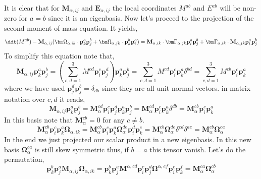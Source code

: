 It is clear that for $\mathbf{M}_{\alpha,ij}$ and $\textbf{E}_{\alpha,ij}$ the local coordinates $M^{ab}$ and $E^{ab}$ will be non-zero for $a=b$ since it is an eigenbasis. 
Now let's proceed to the projection of the second moment of mass equation. 
It yields, 
\begin{align*}
    \ddt (M^{ab})
    - \textbf{M}_{\alpha,ij}(
    \bm\Omega_{\alpha,ik}\cdot\textbf{p}_k^a\textbf{p}_j^b
    + \bm\Omega_{\alpha,jk}\cdot\textbf{p}_k^b\textbf{p}_i^a
    )
    = \textbf{M}_{\alpha,ik} \cdot \bm\Gamma_{\alpha,jk}\textbf{p}_i^a \textbf{p}_j^b
    +  \bm\Gamma_{\alpha,ik} \cdot \textbf{M}_{\alpha,jk}\textbf{p}_i^a \textbf{p}_j^b
\end{align*}
To simplify this equation note that, 
\begin{equation*}
    \textbf{M}_{\alpha,ij}\textbf{p}_k^a\textbf{p}_j^b
    = (\sum_{c,d=1}^3 M^{cd} \textbf{p}_i^c \textbf{p}_j^d) \textbf{p}_k^a\textbf{p}_j^b
    = \sum_{c,d=1}^3 M^{cd} \textbf{p}_i^c  \textbf{p}_k^a \delta^{bd}
    = \sum_{c,d=1}^3 M^{cb} \textbf{p}_i^c  \textbf{p}_k^a 
\end{equation*}
where we have used $\textbf{p}_j^d \textbf{p}_j^b = \delta_{db}$ since they are all unit normal vectors. 
in matrix notation over $c,d$ it reads, 
\begin{equation*}
    \textbf{M}_{\alpha,ij}\textbf{p}_k^a\textbf{p}_j^b
    = \textbf{M}^{cd}_\alpha \textbf{p}_i^c \textbf{p}_j^d \textbf{p}_k^a\textbf{p}_j^b
    = \textbf{M}^{cd}_\alpha \textbf{p}_i^c \textbf{p}_k^a\delta^{db}
    = \textbf{M}^{cb}_\alpha \textbf{p}_i^c \textbf{p}_k^a
\end{equation*}
In this basis note that $\textbf{M}^{cb}_\alpha = 0$ for any $c\neq b$.
\begin{equation}
    \textbf{M}^{cb}_\alpha \textbf{p}_i^c \textbf{p}_k^a \bm\Omega_{\alpha,ik}
    = 
    \textbf{M}^{cb}_\alpha \textbf{p}_i^c \textbf{p}_k^a 
    \bm\Omega_{\alpha}^{de} \textbf{p}^d_i\textbf{p}^e_k
    = 
    \textbf{M}^{cb}_\alpha  
    \bm\Omega_{\alpha}^{de} 
    \delta^{cd}
    \delta^{ae}
    = 
    \textbf{M}^{cb}_\alpha  
    \bm\Omega_{\alpha}^{ca} 
\end{equation}
In the end we just projected our scalar product in a new eigenbasis. 
In this new basis $\bm\Omega_{\alpha}^{ca}$ is still skew symmetric thus, if $b=a$ 
this tensor vanish. 
Let's do the permutation, 
\begin{equation}
    \textbf{p}_k^b\textbf{p}_j^a 
    \textbf{M}_{\alpha,ij} 
    \bm\Omega_{\alpha,ik} 
    = 
    \textbf{p}_k^b\textbf{p}_j^a 
    \textbf{M}^{\alpha,cd} \textbf{p}_i^c\textbf{p}_j^d
    \bm\Omega^{\alpha,ef} \textbf{p}_i^e\textbf{p}_k^f 
    = 
    \textbf{M}^{ca}_\alpha
    \bm\Omega^{cb}_\alpha
\end{equation}

